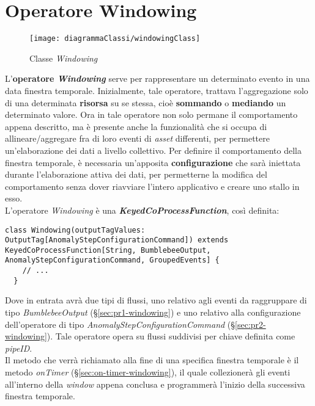 
\section{Operatore Windowing}\label{sec:windowing}
\begin{figure}[H] 
    \centering 
    \texttt{[image: diagrammaClassi/windowingClass]} 
    \caption{Classe \textit{Windowing}}
\end{figure}
L'\textbf{operatore \textit{Windowing}} serve per rappresentare un determinato evento in una data finestra temporale. Inizialmente, tale operatore, trattava l'aggregazione solo di una determinata \textbf{risorsa} su se stessa, cioè \textbf{sommando} o \textbf{mediando} un determinato valore. Ora in tale operatore non solo permane il comportamento appena descritto, ma è presente anche la funzionalità che si occupa di allineare/aggregare fra di loro eventi di \textit{asset} differenti, per permettere un'elaborazione dei dati a livello collettivo. Per definire il comportamento della finestra temporale, è necessaria un'apposita \textbf{configurazione} che sarà iniettata durante l'elaborazione attiva dei dati, per permetterne la modifica del comportamento senza dover riavviare l'intero applicativo e creare uno stallo in esso.\\
L'operatore \textit{Windowing} è una \textbf{\textit{KeyedCoProcessFunction}}, così definita:
\begin{verbatim}
class Windowing(outputTagValues: OutputTag[AnomalyStepConfigurationCommand]) extends KeyedCoProcessFunction[String, BumblebeeOutput, AnomalyStepConfigurationCommand, GroupedEvents] {
	// ...
  }
\end{verbatim}
Dove in entrata avrà due tipi di flussi, uno relativo agli eventi da raggruppare di tipo \textit{BumblebeeOutput} (\S\ref{sec:pr1-windowing}) e uno relativo alla configurazione dell'operatore di tipo \textit{AnomalyStepConfigurationCommand} (\S\ref{sec:pr2-windowing}). Tale operatore opera su flussi suddivisi per chiave definita come \textit{pipeID}.\\
Il metodo che verrà richiamato alla fine di una specifica finestra temporale è il metodo \textit{onTimer} (\S\ref{sec:on-timer-windowing}), il quale collezionerà gli eventi all'interno della \textit{window} appena conclusa e programmerà l'inizio della successiva finestra temporale.

